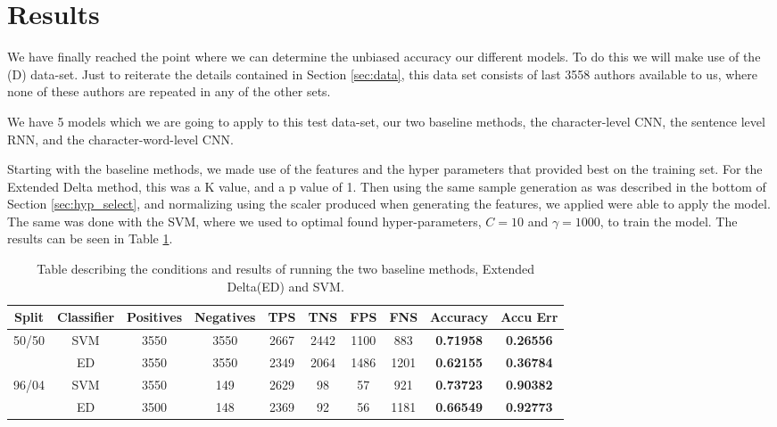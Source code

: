 \section{Results} \label{sec:results}

We have finally reached the point where we can determine the unbiased accuracy
our different models. To do this we will make use of the (D) data-set. Just
to reiterate the details contained in Section \ref{sec:data}, this data set
consists of last 3558 authors available to us, where none of these authors are
repeated in any of the other sets.

We have 5 models which we are going to apply to this test data-set,
our two baseline methods, the character-level \gls{CNN}, the sentence
level RNN, and the character-word-level \gls{CNN}.

Starting with the baseline methods, we made use of the features and the
hyper parameters that provided best on the training set.
For the Extended Delta method, this was a K value, and a p value of 1.
Then using the same sample generation as was described in the bottom
of Section \ref{sec:hyp_select}, and normalizing using the scaler
produced when generating the features, we applied were able to apply the model.
The same was done with the SVM, where we used to optimal found hyper-parameters,
$C=10$ and $\gamma = 1000$, to train the model. The results can be seen in Table
\ref{tab:baseline-res}.

\begin{table}[h]
\centering
\begin{tabular}{|c|c|c|c|c|c|c|c||c|c|}
\hline
Split & Classifier & Positives & Negatives & TPS & TNS & FPS & FNS & \textbf{Accuracy} & \textbf{Accu Err} \\ \hline
\multirow{2}{*}{50/50} & SVM & 3550 & 3550 & 2667 & 2442 & 1100 & 883 & \textbf{0.71958} & \textbf{0.26556} \\ \cline{2-10} 
 & ED & 3550 & 3550 & 2349 & 2064 & 1486 & 1201 & \textbf{0.62155} & \textbf{0.36784} \\ \hline
\multirow{2}{*}{96/04} & SVM & 3550 & 149 & 2629 & 98 & 57 & 921 & \textbf{0.73723} & \textbf{0.90382} \\ \cline{2-10} 
 & ED & 3500 & 148 & 2369 & 92 & 56 & 1181 & \textbf{0.66549} & \textbf{0.92773} \\ \hline
\end{tabular}
\caption{Table describing the conditions and results of running the two baseline methods,
Extended Delta(ED) and SVM. }
\label{tab:baseline-res}
\end{table}


